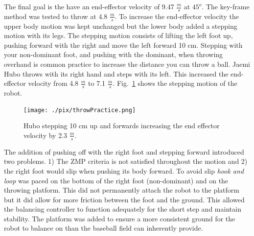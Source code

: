 The final goal is the have an end-effector velocity of 9.47 $\frac{m}{s}$ at $45^o$.  
The key-frame method was tested to throw at 4.8 $\frac{m}{s}$.  
To increase the end-effector velocity the upper body motion was kept unchanged but the lower body added a stepping motion with its legs.
The stepping motion consists of lifting the left foot up, pushing forward with the right and move the left forward 10 cm.  
Stepping with your non-dominant foot, and pushing with the dominant, when throwing overhand is common practice to increase the distance you can throw a ball.  
Jaemi Hubo throws with its right hand and steps with its left.  
This increased the end-effector velocity from 4.8 $\frac{m}{s}$ to 7.1 $\frac{m}{s}$.
Fig.~\ref{fig:hubo-step} shows the stepping motion of the robot.

\begin{figure}[t]
  \centering
\texttt{[image: ./pix/throwPractice.png]}
  \caption{Hubo stepping 10 cm up and forwards increasing the end effector velocity by 2.3 $\frac{m}{s}$.}
  \label{fig:hubo-step}
\end{figure}

The addition of pushing off with the right foot and stepping forward introduced two problems.  1) The ZMP criteria is not satisfied throughout the motion and 2) the right foot would slip when pushing its body forward.  
To avoid slip \textit{hook and loop} was paced on the bottom of the right foot (non-dominant) and on the throwing platform.  
This did not permanently attach the robot to the platform but it did allow for more friction between the foot and the ground.
This allowed the balancing controller to function adequately for the short step and maintain stability.
The platform was added to ensure a more consistent ground for the robot to balance on than the baseball field can inherently provide.

